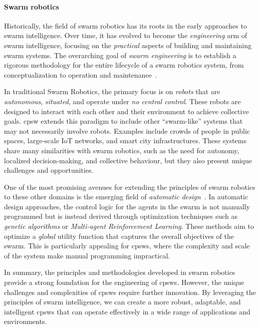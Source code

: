 \paragraph*{Swarm robotics}

Historically, 
 the field of swarm robotics has its roots in the early approaches to swarm intelligence. 
 Over time, it has evolved to become the \textit{engineering} arm of swarm intelligence, 
 focusing on the \emph{practical} aspects of building and maintaining swarm systems. 
 The overarching goal of \emph{swarm engineering} is to establish a rigorous methodology for the entire lifecycle of a swarm robotics system, 
 from conceptualization to operation and maintenance~\cite{DBLP:journals/swarm/BrambillaFBD13}.

In traditional Swarm Robotics, the primary focus is on \textit{robots} that are \emph{autonomous}, \emph{situated}, and operate under \emph{no central control}. 
 These robots are designed to interact with each other and their environment to achieve collective goals. 
 \ac{cpsw} extends this paradigm to include other ``swarm-like'' systems that may not necessarily involve robots. 
 Examples include crowds of people in public spaces, 
 large-scale IoT networks, and smart city infrastructures. 
 These systems share many similarities with swarm robotics, 
 such as the need for autonomy, 
 localized decision-making, 
 and collective behaviour, but they also present unique challenges and opportunities.

One of the most promising avenues for extending the principles of swarm robotics to these other domains is the emerging field of \textit{automatic design}~\cite{DBLP:journals/firai/FrancescaB16}. 
 In automatic design approaches, 
 the control logic for the agents in the swarm is not manually programmed but is instead derived through optimization techniques such as \textit{genetic algorithms} or \textit{Multi-agent Reinforcement Learning}.
These methods aim to optimize a \textit{global} utility function that captures the overall objectives of the swarm. 
 This is particularly appealing for \acp{cpsw}, 
 where the complexity and scale of the system make manual programming impractical.

In summary, 
 the principles and methodologies developed in swarm robotics provide a strong foundation for the engineering of \acp{cpsw}. 
 However, the unique challenges and complexities of \acp{cpsw} require further innovation. 
 By leveraging the principles of swarm intelligence,
 we can create a more robust, adaptable, and intelligent \acp{cpsw} that can operate effectively in a wide range of applications and environments.

